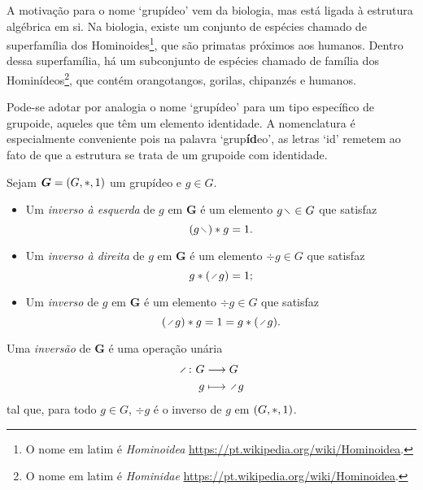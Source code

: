 A motivação para o nome `grupídeo' vem da biologia, mas está ligada à estrutura algébrica em si. Na biologia, existe um conjunto de espécies chamado de superfamília dos Hominoides\footnote{O nome em latim é \textit{Hominoidea} \url{https://pt.wikipedia.org/wiki/Hominoidea}.}, que são primatas próximos aos humanos. Dentro dessa superfamília, há um subconjunto de espécies chamado de família dos Hominídeos\footnote{O nome em latim é \textit{Hominidae} \url{https://pt.wikipedia.org/wiki/Hominoidea}.}, que contém orangotangos, gorilas, chipanzés e humanos.

Pode-se adotar por analogia o nome `grupídeo' para um tipo específico de grupoide, aqueles que têm um elemento identidade. A nomenclatura é especialmente conveniente pois na palavra `grup\textbf{íd}eo', as letras `id' remetem ao fato de que a estrutura se trata de um grupoide com identidade.

\begin{definition}[Inverso]
Sejam $\bm G = (G,\ast,1)$ um grupídeo e $g \in G$.
	\begin{itemize}
	\item Um \emph{inverso à esquerda} de $g$ em $\bm G$ é um elemento $g \vid \in G$ que satisfaz
		\begin{equation*}
		(g \vid) \opb g = \id.
		\end{equation*}
	\item Um \emph{inverso à direita} de $g$ em $\bm G$ é um elemento $\div g \in G$ que satisfaz
		\begin{equation*}
		g \opb (\div g) = \id;
		\end{equation*}
	\item Um \emph{inverso} de $g$ em $\bm G$ é um elemento $\div g \in G$ que satisfaz
		\begin{equation*}
		(\div g) \opb g = \id = g \opb (\div g).
		\end{equation*}
	\end{itemize}

Uma \emph{inversão} de $\bm G$ é uma operação unária
	\begin{align*}
	\func{\div}{G}{G}{g}{\div g}
	\end{align*}
tal que, para todo $g \in G$, $\div g$ é o inverso de $g$ em $(G,\ast,1)$.
\end{definition}

